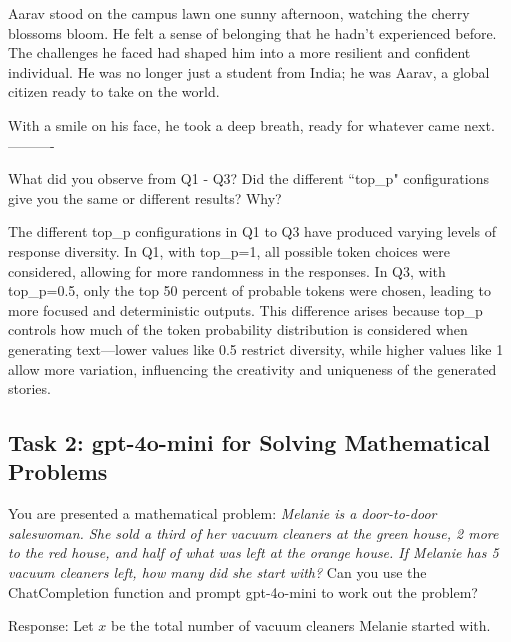 \documentclass[11pt,addpoints,answers]{exam}
\begin{document}
\begin{questions}
\begin{tcolorbox}[fit,height=22cm, width=16cm, blank, borderline={1pt}{-2pt},nobeforeafter]
Aarav stood on the campus lawn one sunny afternoon, watching the cherry blossoms bloom. He felt a sense of belonging that he hadn’t experienced before. The challenges he faced had shaped him into a more resilient and confident individual. He was no longer just a student from India; he was Aarav, a global citizen ready to take on the world.

With a smile on his face, he took a deep breath, ready for whatever came next.
----------
    \end{tcolorbox}

    \question[10] What did you observe from Q1 - Q3? Did the different ``top\_p" configurations give you the same or different results? Why?
    
    \begin{tcolorbox}[fit, height=6cm, width=16cm, blank, borderline={1pt}{-2pt}, nobeforeafter, breakable]
    The different top\_p configurations in Q1 to Q3 have produced varying levels of response diversity. In Q1, with top\_p=1, all possible token choices were considered, allowing for more randomness in the responses. In Q3, with top\_p=0.5, only the top 50 percent of probable tokens were chosen, leading to more focused and deterministic outputs. This difference arises because top\_p controls how much of the token probability distribution is considered when generating text—lower values like 0.5 restrict diversity, while higher values like 1 allow more variation, influencing the creativity and uniqueness of the generated stories.
\end{tcolorbox}


\clearpage

\subsection*{Task 2: gpt-4o-mini for Solving Mathematical Problems}

    \question[5] You are presented a mathematical problem: \textit{Melanie is a door-to-door saleswoman. She sold a third of her vacuum cleaners at the green house, 2 more to the red house, and half of what was left at the orange house. If Melanie has 5 vacuum cleaners left, how many did she start with?}
    Can you use the ChatCompletion function and prompt gpt-4o-mini to work out the problem?
    
    \begin{tcolorbox}[fit,height=16.5cm, width=16cm, blank, borderline={1pt}{-2pt},nobeforeafter]
    Response:  Let \( x \) be the total number of vacuum cleaners Melanie started with.


\end{tcolorbox}
\end{questions}
\end{document}
